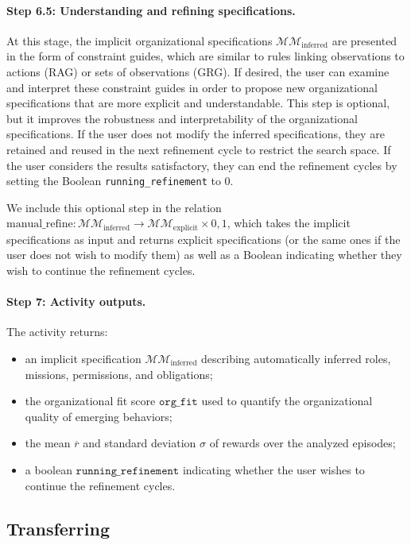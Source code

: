 \documentclass[pdflatex,sn-mathphys-num]{sn-jnl}%
\theoremstyle{thmstyleone}%
\theoremstyle{thmstyletwo}%
\theoremstyle{thmstylethree}%
\begin{document}
\paragraph*{Step 6.5: Understanding and refining specifications.}
At this stage, the implicit organizational specifications $\mathcal{MM}_{\text{inferred}}$ are presented in the form of constraint guides, which are similar to rules linking observations to actions (RAG) or sets of observations (GRG). If desired, the user can examine and interpret these constraint guides in order to propose new organizational specifications that are more explicit and understandable. This step is optional, but it improves the robustness and interpretability of the organizational specifications. If the user does not modify the inferred specifications, they are retained and reused in the next refinement cycle to restrict the search space. If the user considers the results satisfactory, they can end the refinement cycles by setting the Boolean \texttt{running\_refinement} to 0.

We include this optional step in the relation $\text{manual\_refine}: \mathcal{MM}_{\text{inferred}} \rightarrow \mathcal{MM}_{\text{explicit}} \times {0,1}$, which takes the implicit specifications as input and returns explicit specifications (or the same ones if the user does not wish to modify them) as well as a Boolean indicating whether they wish to continue the refinement cycles.

\paragraph*{Step 7: Activity outputs.}
The activity returns:
\begin{itemize}
    \item an implicit specification $\mathcal{MM}_{\text{inferred}}$ describing automatically inferred roles, missions, permissions, and obligations;
    \item the organizational fit score $\texttt{org\_fit}$ used to quantify the organizational quality of emerging behaviors;
    \item the mean $\overline{r}$ and standard deviation $\sigma$ of rewards over the analyzed episodes;
    \item a boolean $\texttt{running\_refinement}$ indicating whether the user wishes to continue the refinement cycles.
\end{itemize}


\subsection{Transferring}\label{sec:transferring}
\end{document}

